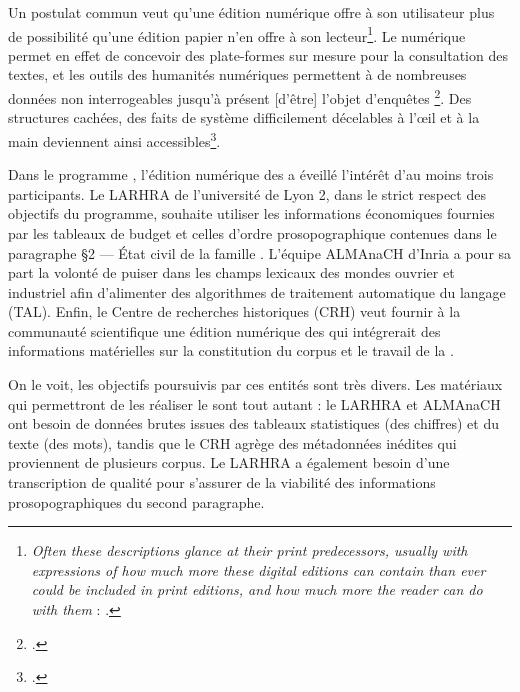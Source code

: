 Un postulat commun veut qu'une édition numérique offre à son utilisateur plus de possibilité qu'une édition papier n'en offre à son lecteur\footnote{\og \textit{Often these descriptions glance at their print predecessors, usually with expressions of how much more these digital editions can contain than ever could be included in print editions, and how much more the reader can do with them} \fg{} : \cite[p. 105-106]{robinson}.}. Le numérique permet en effet de concevoir des plate-formes sur mesure pour la consultation des textes, et les outils des humanités numériques permettent à \og de nombreuses données non interrogeables jusqu’à présent [d'être] l’objet d’enquêtes \fg\footcite[p. 20]{duval}. \og Des structures cachées, des faits de système difficilement décelables à l’œil et à la main \fg{} deviennent ainsi accessibles\footcite{duval}.

Dans le programme \timeus{}, l'édition numérique des \odm{} a éveillé l'intérêt d'au moins trois participants. Le LARHRA de l'université de Lyon 2, dans le strict respect des objectifs du programme, souhaite utiliser les informations économiques fournies par les tableaux de budget et celles d'ordre prosopographique contenues dans le paragraphe \og §2 --- État civil de la famille \fg. L'équipe ALMAnaCH d'Inria a pour sa part la volonté de puiser dans les champs lexicaux des mondes ouvrier et industriel afin d'alimenter des algorithmes de traitement automatique du langage (TAL). Enfin, le Centre de recherches historiques (CRH) veut fournir à la communauté scientifique une édition numérique des \odm{} qui intégrerait des informations matérielles sur la constitution du corpus et le travail de la \sess.

On le voit, les objectifs poursuivis par ces entités sont très divers. Les matériaux qui permettront de les réaliser le sont tout autant : le LARHRA et ALMAnaCH ont besoin de données brutes issues des tableaux statistiques (des chiffres) et du texte (des mots), tandis que le CRH agrège des métadonnées inédites qui proviennent de plusieurs corpus. Le LARHRA a également besoin d'une transcription de qualité pour s'assurer de la viabilité des informations prosopographiques du second paragraphe.

